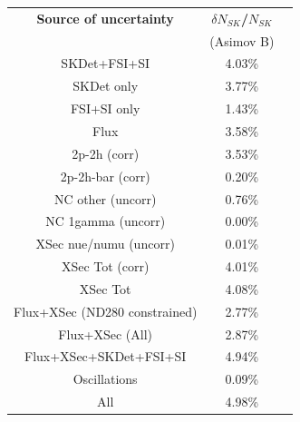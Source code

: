 


\begin{table}[htb]
\centering
\begin{tabular}{| c | c | c |}
\hline
  {\bf Source of uncertainty}    & \multicolumn{1}{c|}{{\bf ${\delta}N_{SK}$/$N_{SK}$}}\\
                                 & \multicolumn{1}{c|}{(Asimov B)}\\

\hline
\hline  
SKDet+FSI+SI                   & 4.03\%                        \\
SKDet only                   & 3.77\%                        \\
FSI+SI only                   & 1.43\%                        \\
\hline
  Flux                           & 3.58\%                        \\
\hline
\hline
  2p-2h (corr)                     & 3.53\%                        \\
  2p-2h-bar (corr)                  & 0.20\%                        \\
  NC other (uncorr)              & 0.76\%                        \\
  NC 1gamma (uncorr)             & 0.00\%                        \\
  XSec nue/numu (uncorr)                 & 0.01\%                        \\
\hline  
  XSec Tot (corr)                  & 4.01\%                        \\
  XSec Tot                       & 4.08\%                        \\
\hline
\hline
  Flux+XSec (ND280 constrained)                      & 2.77\%                        \\
  Flux+XSec (All)                      				& 2.87\%                        \\
\hline
  Flux+XSec+SKDet+FSI+SI         & 4.94\%                        \\
\hline
\hline
  Oscillations                   & 0.09\%                        \\
\hline
\hline
  All                            & 4.98\%                        \\
\hline
\hline


\end{tabular}
\end{table}
